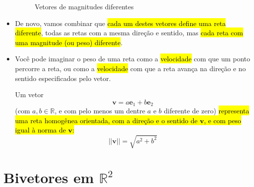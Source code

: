 \documentclass[
  letterpaper,
  DIV=11,
  numbers=noendperiod]{scrreprt}
\begin{document}
\begin{itemize}
\begin{figure}[t]
{  }

  \caption{\label{fig-vetores}Vetores de magnitudes diferentes}

  \end{figure}
\item
  De novo, vamos combinar que {\hl{cada um destes vetores define uma
  reta diferente}}, todas as retas com a mesma direção e sentido, mas
  {\hl{cada reta com uma magnitude (ou peso) diferente}}.
\item
  Você pode imaginar o peso de uma reta como a {\hl{velocidade}} com que
  um ponto percorre a reta, ou como a {\hl{velocidade}} com que a reta
  avança na direção e no sentido especificados pelo vetor.

  \begin{tcolorbox}[standard jigsaw,colbacktitle=quarto-callout-note-color!10!white, colback=white, opacitybacktitle=0.6, colframe=quarto-callout-note-color-frame, bottomtitle=1mm, toptitle=1mm, coltitle=black, titlerule=0mm, leftrule=.75mm, title=\textcolor{quarto-callout-note-color}{\faInfo}\hspace{0.5em}{Resumindo: vetores \(=\) retas homogêneas orientadas e com peso}, left=2mm, rightrule=.15mm, arc=.35mm, toprule=.15mm, bottomrule=.15mm, opacityback=0]
  Um vetor \[
  \mathbf{v} = a\mathbf{e}_{1} + b\mathbf{e}_{2}
  \] (com $a, b \in \mathbb{R}$, e com pelo menos um dentre $a$ e $b$
  diferente de zero) {\hl{representa uma reta homogênea orientada, com a
  direção e o sentido de $\mathbf{v}$, e com peso igual à norma de
  $\mathbf{v}$:}} \[
  ||\mathbf{v}|| = \sqrt{a^2 + b^2}
  \]
  \end{tcolorbox}
\end{itemize}

\hypertarget{bivetores-em-mathbbr2}{%
\section{\texorpdfstring{Bivetores em
$\mathbb{R}^2$}{Bivetores em }}\label{bivetores-em-mathbbr2}}
\end{document}
